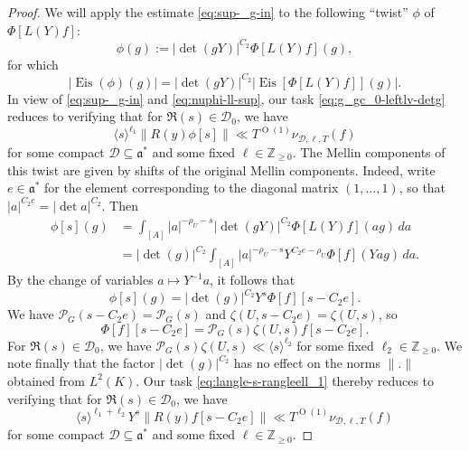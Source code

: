 \documentclass[reqno]{amsart}
\def\O{\operatorname{O}}
\DeclareMathOperator{\Eis}{Eis}
\theoremstyle{plain} \newtheorem{theorem} {Theorem}
\theoremstyle{definition} \newtheorem{definition} [theorem] {Definition}
\theoremstyle{itplain} %
\numberwithin{equation}{section}
\numberwithin{theorem}{section}
\renewcommand{\geq}{\geqslant}
\begin{document}
\begin{proof}
We will apply the estimate \ref{eq:sup-_g-in} to the following ``twist'' $\phi$ of $\Phi[L(Y) f]$:
\begin{equation*}
  \phi(g) :=
  |\det(g Y)|^{C_2} \Phi[L(Y)f](g),
\end{equation*}
for which
\begin{equation*}
  |\Eis(\phi)(g)| = |\det(g Y)|^{C_2} |\Eis[\Phi[L(Y) f]](g)|.
\end{equation*}
In view of \eqref{eq:sup-_g-in} and \eqref{eq:nuphi-ll-sup}, our task \eqref{eq:g_gc_0-leftlv-detg} reduces to verifying that for $\Re(s) \in \mathcal{D}_0$, we have
\begin{equation}\label{eq:langle-s-rangleell_1}
  \langle s \rangle^{\ell_1} \|R(y) \phi[s]\| \ll T^{\O(1)} \nu_{\mathcal{D}, \ell, T}(f)
\end{equation}
for some compact $\mathcal{D} \subseteq \mathfrak{a}^*$ and some fixed $\ell \in \mathbb{Z}_{\geq 0}$.  The Mellin components of this twist are given by shifts of the original Mellin components.  Indeed, write $e \in \mathfrak{a}^*$ for the element corresponding to the diagonal matrix $(1,\dotsc,1)$, so that $|a|^{C_2 e} = |\det a|^{C_2}$.  Then
\begin{align*}
  \phi[s](g)
  &=
    \int _{[A]} |a|^{-\rho_U - s} |\det(g Y)|^{C_2} \Phi[L(Y) f](a g) \, d a \\
  &=
     |\det(g)|^{C_2} \int _{[A]} |a|^{-\rho_U - s} Y^{C_2 e - \rho_U} \Phi[f](Y a g) \, d a.
\end{align*}
By the change of variables $a \mapsto Y^{-1} a$, it follows that
\begin{equation}\label{eq:phis-=-left}
  \phi[s](g) = |\det(g)|^{C_2} Y^s \Phi[f][s - C_2 e].
\end{equation}
We have $\mathcal{P}_G(s - C_2 e) = \mathcal{P}_G(s)$ and $\zeta(U,s - C_2 e) = \zeta(U,s)$, so
\begin{equation*}
  \Phi[f][s - C_2 e]
  = \mathcal{P}_G(s) \zeta(U,s) f[s - C_2 e].
\end{equation*}
For $\Re(s) \in \mathcal{D}_0$, we have $\mathcal{P}_G(s) \zeta(U,s) \ll \langle s \rangle^{\ell_2}$ for some fixed $\ell_2 \in \mathbb{Z}_{\geq 0}$.  We note finally that the factor $|\det(g)|^{C_2}$ has no effect on the norms $\|.\|$ obtained from $L^2(K)$.  Our task \eqref{eq:langle-s-rangleell_1} thereby reduces to verifying that for $\Re(s) \in \mathcal{D}_0$, we have
\begin{equation}\label{eq:langle-s-rangleell_1-1}
  \langle s \rangle^{\ell_1 + \ell_2} Y^s \|R(y) f[s-C_2 e]\| \ll T^{\O(1)} \nu_{\mathcal{D},\ell,T}(f)
\end{equation}
for some compact $\mathcal{D} \subseteq \mathfrak{a}^*$ and some fixed $\ell \in \mathbb{Z}_{\geq 0}$.


\end{proof}
\end{document}
